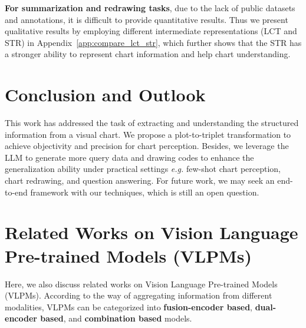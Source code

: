 \documentclass{article} \usepackage{iclr2024_conference,times}
\begin{document}
{\noindent\textbf{For summarization and redrawing tasks}, due to the lack of public datasets and annotations, it is difficult to provide quantitative results. Thus we present qualitative results by employing different intermediate representations (LCT and STR) in Appendix~\ref{app:compare_lct_str}, which further shows that the STR has a stronger ability to represent chart information and help chart understanding.





\vspace{-8pt}
\section{Conclusion and Outlook}
\vspace{-8pt}
This work has addressed the task of extracting and understanding the structured information from a visual chart. We propose a plot-to-triplet transformation to achieve objectivity and precision for chart perception. Besides, we leverage the LLM to generate more query data and drawing codes to enhance the generalization ability under practical settings \textit{e.g.} few-shot chart perception, chart redrawing, and question answering. For future work, we may seek an end-to-end framework with our techniques, which is still an open question.





\clearpage









\newpage
\appendix
\section{Related Works on Vision Language Pre-trained Models (VLPMs)}
\label{app:related_work}
Here, we also discuss related works on Vision Language Pre-trained Models (VLPMs). According to the way of aggregating information from different modalities, VLPMs can be categorized into \textbf{fusion-encoder based}, \textbf{dual-encoder based}, and \textbf{combination based} models.

}
\end{document}
